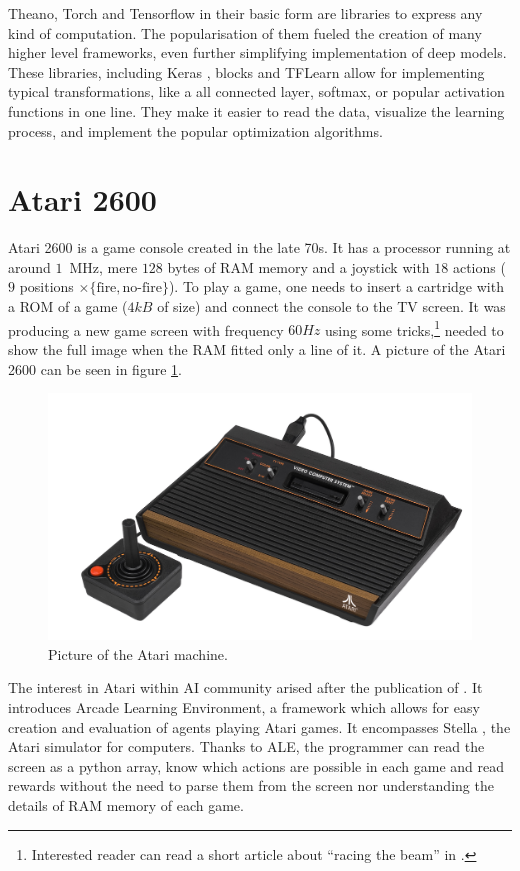 Theano, Torch and Tensorflow in their basic form are libraries to express any kind of computation. The popularisation of them fueled the creation of many higher level frameworks, even further simplifying implementation of deep models. These libraries, including Keras \cite{keras}, blocks \cite{blocks} and TFLearn \cite{tflearn} allow for implementing typical transformations, like a all connected layer, softmax, or popular activation functions in one line. They make it easier to read the data, visualize the learning process, and implement the popular optimization algorithms.

\section{Atari 2600}
Atari 2600 is a game console created in the late 70s. It has a processor running at around $1$~MHz, mere $128$ bytes of RAM memory and a joystick with $18$ actions ($9$ positions $\times \{\mbox{fire}, \mbox{no-fire}\}$). To play a game, one needs to insert a cartridge with a ROM of a game ($4kB$ of size) and connect the console to the TV screen. It was producing a new game screen with frequency $60Hz$ using some tricks,\footnote{Interested reader can read a short article about ``racing the beam'' in \cite{racing-beam}.} needed to show the full image when the RAM fitted only a line of it. A picture of the Atari 2600 can be seen in figure \ref{atari-picture}.

\begin{figure}
  \centering
  \includegraphics[width=.8\linewidth]{images/atari.jpg}
  \caption{Picture of the Atari machine.}\label{atari-picture}
\end{figure}

The interest in Atari within AI community arised after the publication of \cite{ale}. It introduces Arcade Learning Environment, a framework which allows for easy creation and evaluation of agents playing Atari games. It encompasses Stella \cite{stella}, the Atari simulator for computers. Thanks to ALE, the programmer can read the screen as a python array, know which actions are possible in each game and read rewards without the need to parse them from the screen nor understanding the details of RAM memory of each game.


